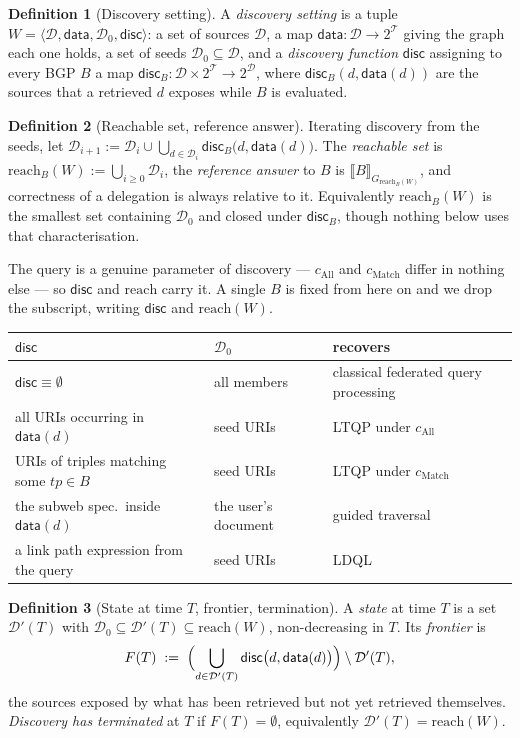 \documentclass[11pt,a4paper]{article}
\theoremstyle{definition}
\newtheorem{definition}{Definition}
\theoremstyle{plain}
\theoremstyle{remark}
\newcommand{\Dd}{\mathcal{D}}
\newcommand{\Tt}{\mathcal{T}}
\newcommand{\dataf}{\mathsf{data}}
\newcommand{\disc}{\mathsf{disc}}
\newcommand{\reach}{\mathrm{reach}}
\newcommand{\ev}[2]{\llbracket #1 \rrbracket_{#2}}
\begin{document}
\begin{definition}[Discovery setting]
\label{def:setting}
A \emph{discovery setting} is a tuple
$W = \langle \Dd, \dataf, \Dd_0, \disc \rangle$: a set of sources $\Dd$, a map
$\dataf : \Dd \to 2^{\Tt}$ giving the graph each one holds, a set of seeds
$\Dd_0 \subseteq \Dd$, and a \emph{discovery function} $\disc$ assigning to every BGP $B$
a map $\disc_B : \Dd \times 2^{\Tt} \to 2^{\Dd}$, where $\disc_B(d, \dataf(d))$ are the
sources that a retrieved $d$ exposes while $B$ is evaluated.
\end{definition}

\begin{definition}[Reachable set, reference answer]
\label{def:reach}
Iterating discovery from the seeds, let
$\Dd_{i+1} := \Dd_i \cup \bigcup_{d \in \Dd_i} \disc_B\bigl(d, \dataf(d)\bigr)$. The
\emph{reachable set} is $\reach_B(W) := \bigcup_{i \geq 0} \Dd_i$, the \emph{reference
answer} to $B$ is $\ev{B}{G_{\reach_B(W)}}$, and correctness of a delegation is always
relative to it. Equivalently $\reach_B(W)$ is the smallest set containing $\Dd_0$ and
closed under $\disc_B$, though nothing below uses that characterisation.
\end{definition}

\noindent
The query is a genuine parameter of discovery --- $c_{\mathrm{All}}$ and
$c_{\mathrm{Match}}$ differ in nothing else --- so $\disc$ and $\reach$ carry it. A
single $B$ is fixed from here on and we drop the subscript, writing $\disc$ and
$\reach(W)$.

\begin{center}
\small\begin{tabular}{@{}p{5.1cm}p{2.7cm}l@{}}
\hline
$\disc$ & $\Dd_0$ & recovers \\
\hline
$\disc \equiv \emptyset$
  & all members
  & classical federated query processing \\
all URIs occurring in $\dataf(d)$
  & seed URIs
  & LTQP under $c_{\mathrm{All}}$ \\
URIs of triples matching some $tp \in B$
  & seed URIs
  & LTQP under $c_{\mathrm{Match}}$ \\
the subweb spec.\ inside $\dataf(d)$
  & the user's document
  & guided traversal \\
a link path expression from the query
  & seed URIs
  & LDQL \\
\hline
\end{tabular}
\end{center}

\begin{definition}[State at time $T$, frontier, termination]
\label{def:state}
A \emph{state} at time $T$ is a set $\Dd'(T)$ with
$\Dd_0 \subseteq \Dd'(T) \subseteq \reach(W)$, non-decreasing in $T$. Its
\emph{frontier} is
\[
  F(T) \;:=\; \Bigl( \bigcup_{d \in \Dd'(T)} \disc\bigl(d, \dataf(d)\bigr) \Bigr)
              \setminus \Dd'(T),
\]
the sources exposed by what has been retrieved but not yet retrieved themselves.
\emph{Discovery has terminated} at $T$ if $F(T) = \emptyset$, equivalently
$\Dd'(T) = \reach(W)$.
\end{definition}
\end{document}
